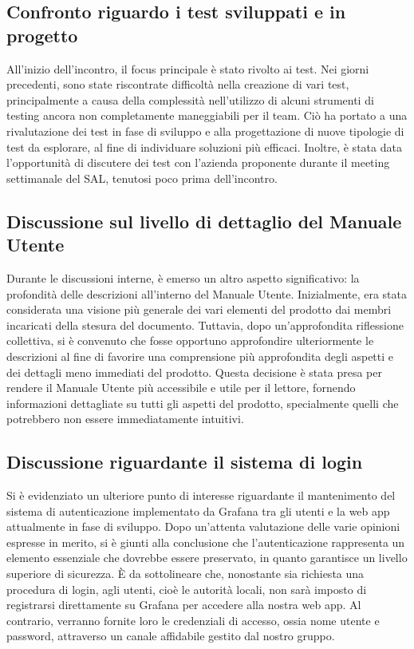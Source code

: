 \documentclass{article}
\begin{document}
    \subsection{Confronto riguardo i test sviluppati e in progetto}
    All'inizio dell'incontro, il focus principale è stato rivolto ai test. Nei giorni precedenti, sono state riscontrate difficoltà nella creazione di vari test, principalmente a causa della complessità nell'utilizzo di alcuni strumenti di testing ancora non completamente maneggiabili per il team. Ciò ha portato a una rivalutazione dei test in fase di sviluppo e alla progettazione di nuove tipologie di test da esplorare, al fine di individuare soluzioni più efficaci. Inoltre, è stata data l'opportunità di discutere dei test con l'azienda proponente durante il meeting settimanale del SAL, tenutosi poco prima dell'incontro.
    \subsection{Discussione sul livello di dettaglio del Manuale Utente}
    Durante le discussioni interne, è emerso un altro aspetto significativo: la profondità delle descrizioni all'interno del Manuale Utente. Inizialmente, era stata considerata una visione più generale dei vari elementi del prodotto dai membri incaricati della stesura del documento. Tuttavia, dopo un'approfondita riflessione collettiva, si è convenuto che fosse opportuno approfondire ulteriormente le descrizioni al fine di favorire una comprensione più approfondita degli aspetti e dei dettagli meno immediati del prodotto. Questa decisione è stata presa per rendere il Manuale Utente più accessibile e utile per il lettore, fornendo informazioni dettagliate su tutti gli aspetti del prodotto, specialmente quelli che potrebbero non essere immediatamente intuitivi.
    \subsection{Discussione riguardante il sistema di login}
    Si è evidenziato un ulteriore punto di interesse riguardante il mantenimento del sistema di autenticazione implementato da Grafana tra gli utenti e la web app attualmente in fase di sviluppo. Dopo un'attenta valutazione delle varie opinioni espresse in merito, si è giunti alla conclusione che l'autenticazione rappresenta un elemento essenziale che dovrebbe essere preservato, in quanto garantisce un livello superiore di sicurezza. È da sottolineare che, nonostante sia richiesta una procedura di login, agli utenti, cioè le autorità locali, non sarà imposto di registrarsi direttamente su Grafana per accedere alla nostra web app. Al contrario, verranno fornite loro le credenziali di accesso, ossia nome utente e password, attraverso un canale affidabile gestito dal nostro gruppo.
\end{document}
